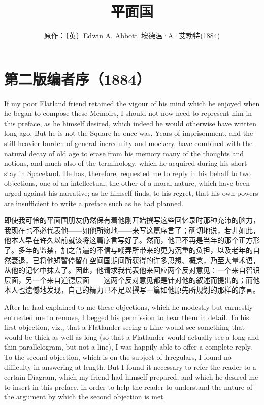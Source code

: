 \documentclass[12pt,UTF8]{ctexbook}
\title{\heiti\zihao{0} 平面国}
\author{原作：〔英〕Edwin A. Abbott\ 埃德温·A·艾勃特(1884)}
\date{}
\begin{document}
\maketitle
\tableofcontents

\frontmatter

\chapter*{第二版编者序（1884）}

If my poor Flatland friend retained the vigour of his mind which he enjoyed when he began to compose these Memoirs, I should not now need to represent him in this preface, as he himself desired, which indeed he would otherwise have written long ago. But he is not the Square he once was. Years of imprisonment, and the still heavier burden of general incredulity and mockery, have combined with the natural decay of old age to erase from his memory many of the thoughts and notions, and much also of the terminology, which he acquired during his short stay in Spaceland. He has, therefore, requested me to reply in his behalf to two objections, one of an intellectual, the other of a moral nature, which have been urged against his narrative; as he himself finds, to his regret, that his own powers are insufficient to write a preface such as he had planned.

即使我可怜的平面国朋友仍然保有着他刚开始撰写这些回忆录时那种充沛的脑力，我现在也不必代表他——如他所愿地——来写这篇序言了；确切地说，若非如此，他本人早在许久以前就该将这篇序言写好了。然而，他已不再是当年的那个正方形了。多年的监禁，加之普遍的不信与嘲弄所带来的更为沉重的负担，以及老年的自然衰退，已将他短暂停留在空间国期间所获得的许多思想、概念，乃至大量术语，从他的记忆中抹去了。因此，他请求我代表他来回应两个反对意见：一个来自智识层面，另一个来自道德层面——这两个反对意见都是针对他的叙述而提出的；而他本人也遗憾地发现，自己的精力已不足以撰写一篇如他原先所规划的那样的序言。

After he had explained to me these objections, which he modestly but earnestly entreated me to remove, I begged his permission to hear them in detail. To his first objection, viz., that a Flatlander seeing a Line would see something that would be thick as well as long (so that a Flatlander would actually see a long and thin parallelogram, but not a line), I was happily able to offer a complete reply. To the second objection, which is on the subject of Irregulars, I found no difficulty in answering at length. But I found it necessary to refer the reader to a certain Diagram, which my friend had himself prepared, and which he desired me to insert in this preface, in order to help the reader to understand the nature of the argument by which the second objection is met.
\end{document}
